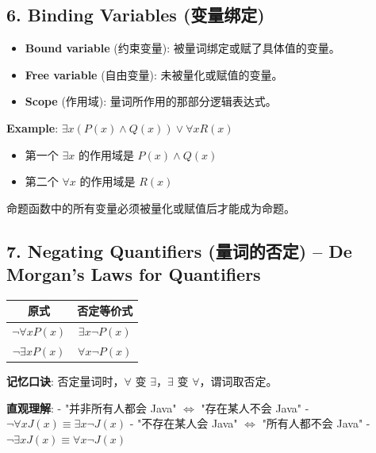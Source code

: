\documentclass[10pt,a4paper,openany]{ctexbook}
\theoremstyle{definition}
\theoremstyle{remark}
\renewenvironment{quote}
  {\list{}{\leftmargin=1em\rightmargin=0pt\topsep=0.5pt\partopsep=0pt}\item[]}
  {\endlist}
\begin{document}
\subsection{6. Binding Variables (变量绑定)}

\begin{itemize}
\item \textbf{Bound variable} (约束变量): 被量词绑定或赋了具体值的变量。
\item \textbf{Free variable} (自由变量): 未被量化或赋值的变量。
\item \textbf{Scope} (作用域): 量词所作用的那部分逻辑表达式。

\end{itemize}

\textbf{Example}: $\exists x (P(x) \land Q(x)) \lor \forall x R(x)$
\begin{itemize}
\item 第一个 $\exists x$ 的作用域是 $P(x) \land Q(x)$
\item 第二个 $\forall x$ 的作用域是 $R(x)$

\end{itemize}

\begin{quote}
命题函数中的所有变量必须被量化或赋值后才能成为命题。

\end{quote}
\vspace{-2pt}

\subsection{7. Negating Quantifiers (量词的否定) -- De Morgan's Laws for Quantifiers}

\begin{center}
\begin{tabular}{cc}
\hline
原式 & 否定等价式 \\ \hline
$\neg \forall x P(x)$ & $\exists x \neg P(x)$ \\
$\neg \exists x P(x)$ & $\forall x \neg P(x)$ \\
\hline
\end{tabular}

\end{center}

\begin{quote}
\textbf{记忆口诀}: 否定量词时，$\forall$ 变 $\exists$，$\exists$ 变 $\forall$，谓词取否定。

\textbf{直观理解}:
- "并非所有人都会 Java" $\iff$ "存在某人不会 Java"
- $\neg \forall x J(x) \equiv \exists x \neg J(x)$
- "不存在某人会 Java" $\iff$ "所有人都不会 Java"
- $\neg \exists x J(x) \equiv \forall x \neg J(x)$

\end{quote}
\vspace{-2pt}
\end{document}
